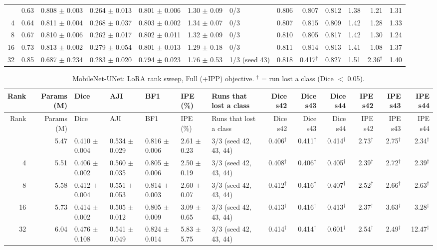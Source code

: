 \documentclass[10pt]{article}
\begin{document}
\begin{landscape}
{\begin{longtable}{r r l l l l l r r r r r r}
\midrule
\endhead
\bottomrule
\endfoot
2 & 0.63 & 0.808 $\pm$ 0.003 & 0.264 $\pm$ 0.013 & 0.801 $\pm$ 0.006 & 1.30 $\pm$ 0.09 & 0/3 & 0.806 & 0.807 & 0.812 & 1.38 & 1.21 & 1.31 \\
4 & 0.64 & 0.811 $\pm$ 0.004 & 0.268 $\pm$ 0.037 & 0.803 $\pm$ 0.002 & 1.34 $\pm$ 0.07 & 0/3 & 0.807 & 0.815 & 0.809 & 1.42 & 1.28 & 1.33 \\
8 & 0.67 & 0.810 $\pm$ 0.006 & 0.262 $\pm$ 0.017 & 0.802 $\pm$ 0.011 & 1.32 $\pm$ 0.09 & 0/3 & 0.810 & 0.805 & 0.817 & 1.42 & 1.30 & 1.24 \\
16 & 0.73 & 0.813 $\pm$ 0.002 & 0.279 $\pm$ 0.054 & 0.801 $\pm$ 0.013 & 1.29 $\pm$ 0.18 & 0/3 & 0.811 & 0.814 & 0.813 & 1.41 & 1.08 & 1.37 \\
32 & 0.85 & 0.687 $\pm$ 0.234 & 0.283 $\pm$ 0.020 & 0.794 $\pm$ 0.023 & 1.76 $\pm$ 0.53 & 1/3 (seed 43) & 0.818 & 0.417$^\dagger$ & 0.827 & 1.51 & 2.36$^\dagger$ & 1.40 \\
\end{longtable}
}
{\footnotesize
\begin{longtable}{r r l l l l l r r r r r r}
\caption{MobileNet-UNet: LoRA rank sweep, Full (+IPP) objective. $^\dagger$ = run lost a class (Dice $<$ 0.05).}\label{tab:rank_mobilenet_unet}\\
\toprule
Rank & Params (M) & Dice & AJI & BF1 & IPE (\%) & Runs that lost a class & Dice s42 & Dice s43 & Dice s44 & IPE s42 & IPE s43 & IPE s44 \\
\midrule
\endfirsthead
\toprule
Rank & Params (M) & Dice & AJI & BF1 & IPE (\%) & Runs that lost a class & Dice s42 & Dice s43 & Dice s44 & IPE s42 & IPE s43 & IPE s44 \\
\midrule
\endhead
\bottomrule
\endfoot
2 & 5.47 & 0.410 $\pm$ 0.004 & 0.534 $\pm$ 0.029 & 0.816 $\pm$ 0.006 & 2.61 $\pm$ 0.23 & 3/3 (seed 42, 43, 44) & 0.406$^\dagger$ & 0.411$^\dagger$ & 0.414$^\dagger$ & 2.73$^\dagger$ & 2.75$^\dagger$ & 2.34$^\dagger$ \\
4 & 5.51 & 0.406 $\pm$ 0.002 & 0.560 $\pm$ 0.035 & 0.805 $\pm$ 0.006 & 2.50 $\pm$ 0.19 & 3/3 (seed 42, 43, 44) & 0.408$^\dagger$ & 0.406$^\dagger$ & 0.405$^\dagger$ & 2.39$^\dagger$ & 2.72$^\dagger$ & 2.39$^\dagger$ \\
8 & 5.58 & 0.412 $\pm$ 0.004 & 0.551 $\pm$ 0.053 & 0.814 $\pm$ 0.003 & 2.60 $\pm$ 0.07 & 3/3 (seed 42, 43, 44) & 0.412$^\dagger$ & 0.416$^\dagger$ & 0.407$^\dagger$ & 2.52$^\dagger$ & 2.66$^\dagger$ & 2.63$^\dagger$ \\
16 & 5.73 & 0.414 $\pm$ 0.002 & 0.505 $\pm$ 0.012 & 0.805 $\pm$ 0.009 & 3.09 $\pm$ 0.65 & 3/3 (seed 42, 43, 44) & 0.413$^\dagger$ & 0.416$^\dagger$ & 0.413$^\dagger$ & 2.37$^\dagger$ & 3.63$^\dagger$ & 3.28$^\dagger$ \\
32 & 6.04 & 0.476 $\pm$ 0.108 & 0.541 $\pm$ 0.049 & 0.824 $\pm$ 0.014 & 5.83 $\pm$ 5.75 & 3/3 (seed 42, 43, 44) & 0.414$^\dagger$ & 0.414$^\dagger$ & 0.601$^\dagger$ & 2.54$^\dagger$ & 2.49$^\dagger$ & 12.47$^\dagger$ \\
\end{longtable}
}


\end{landscape}
\end{document}
